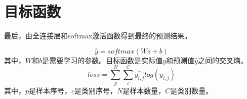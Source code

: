 \section{目标函数}

最后，由全连接层和softmax激活函数得到最终的预测结果。

\begin{equation}
    \hat{y}=softmax(Wz+b)
\end{equation}
其中，$W$和$b$是需要学习的参数。目标函数是实际值$y$和预测值$\hat{y}$之间的交叉熵。
\begin{equation}
    loss=\sum_{p} ^ {N}\sum_{c} ^ {C}\hat{y_{i, j}}log(y_{i, j})
\end{equation}
其中，$p$是样本序号，$c$是类别序号，$N$是样本数量，$C$是类别数量。
